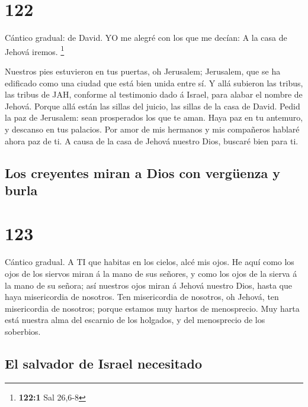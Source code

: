 \hypertarget{section-121}{%
\section{122}\label{section-121}}

 Cántico gradual: de David. YO me alegré con los que me
decían: A la casa de Jehová iremos. \footnote{\textbf{122:1} Sal 26,6-8}

 Nuestros pies estuvieron en tus puertas, oh Jerusalem;
 Jerusalem, que se ha edificado como una ciudad que está
bien unida entre sí.  Y allá subieron las tribus, las tribus
de JAH, conforme al testimonio dado á Israel, para alabar el nombre de
Jehová.  Porque allá están las sillas del juicio, las sillas
de la casa de David.  Pedid la paz de Jerusalem: sean
prosperados los que te aman.  Haya paz en tu antemuro, y
descanso en tus palacios.  Por amor de mis hermanos y mis
compañeros hablaré ahora paz de ti.  A causa de la casa de
Jehová nuestro Dios, buscaré bien para ti.

\hypertarget{los-creyentes-miran-a-dios-con-verguxfcenza-y-burla}{%
\subsection{Los creyentes miran a Dios con vergüenza y
burla}\label{los-creyentes-miran-a-dios-con-verguxfcenza-y-burla}}

\hypertarget{section-122}{%
\section{123}\label{section-122}}

 Cántico gradual. A TI que habitas en los cielos, alcé mis
ojos.  He aquí como los ojos de los siervos miran á la mano
de sus señores, y como los ojos de la sierva á la mano de su señora; así
nuestros ojos miran á Jehová nuestro Dios, hasta que haya misericordia
de nosotros.  Ten misericordia de nosotros, oh Jehová, ten
misericordia de nosotros; porque estamos muy hartos de menosprecio.
 Muy harta está nuestra alma del escarnio de los holgados, y
del menosprecio de los soberbios.

\hypertarget{el-salvador-de-israel-necesitado}{%
\subsection{El salvador de Israel
necesitado}\label{el-salvador-de-israel-necesitado}}

